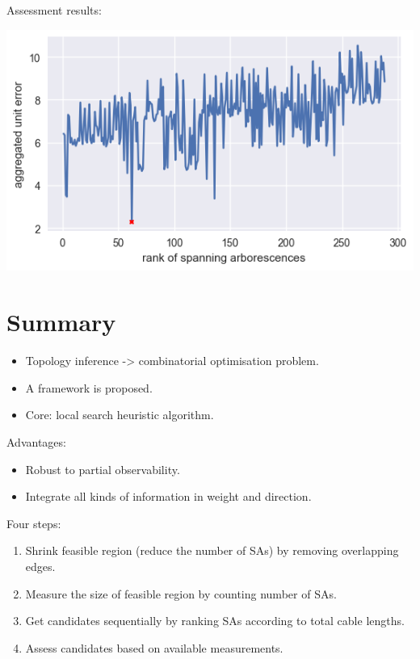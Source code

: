 \documentclass[
]{book}
\providecommand{\tightlist}{%
  \setlength{\itemsep}{0pt}\setlength{\parskip}{0pt}}
\begin{document}
Assessment results:

\begin{center}\includegraphics{Pictures/errors_288} \end{center}

\hypertarget{summary}{%
\section{Summary}\label{summary}}

\begin{itemize}
\tightlist
\item
  Topology inference -\textgreater{} combinatorial optimisation problem.
\item
  A framework is proposed.
\item
  Core: local search heuristic algorithm.
\end{itemize}

Advantages:

\begin{itemize}
\tightlist
\item
  Robust to partial observability.
\item
  Integrate all kinds of information in weight and direction.
\end{itemize}

Four steps:

\begin{enumerate}
\def\labelenumi{\arabic{enumi}.}
\tightlist
\item
  Shrink feasible region (reduce the number of SAs) by removing overlapping
  edges.
\item
  Measure the size of feasible region by counting number of SAs.
\item
  Get candidates sequentially by ranking SAs according to total cable lengths.
\item
  Assess candidates based on available measurements.
\end{enumerate}
\end{document}
